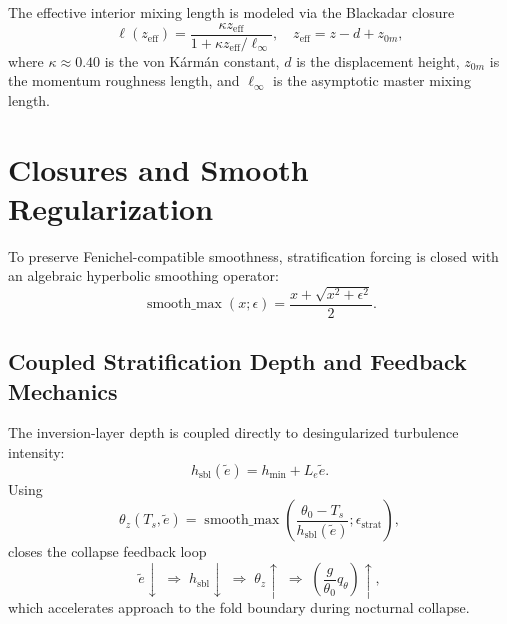 \documentclass[11pt]{article}
\begin{document}
The effective interior mixing length is modeled via the Blackadar closure
\begin{equation}
\ell(z_{\text{eff}}) = \frac{\kappa z_{\text{eff}}}{1 + \kappa z_{\text{eff}}/\ell_\infty}, \quad z_{\text{eff}} = z - d + z_{0m},
\label{eq:blackadar_length}
\end{equation}
where $\kappa \approx 0.40$ is the von Kármán constant, $d$ is the displacement height, $z_{0m}$ is the momentum roughness length, and $\ell_\infty$ is the asymptotic master mixing length.

\section{Closures and Smooth Regularization}
\label{sec:closures}

To preserve Fenichel-compatible smoothness, stratification forcing is closed with an algebraic hyperbolic smoothing operator:
\begin{equation}
\operatorname{smooth\_max}(x;\epsilon)=\frac{x+\sqrt{x^2+\epsilon^2}}{2}.
\label{eq:smooth_max_closure}
\end{equation}

\subsection{Coupled Stratification Depth and Feedback Mechanics}
\label{subsec:coupled_sbl_depth}

The inversion-layer depth is coupled directly to desingularized turbulence intensity:
\begin{equation}
h_{\text{sbl}}(\tilde{e}) = h_{\min} + L_e\tilde{e}.
\label{eq:dynamic_h_sbl}
\end{equation}
Using
\begin{equation}
\theta_z(T_s,\tilde{e}) = \operatorname{smooth\_max}\!\left(\frac{\theta_0-T_s}{h_{\text{sbl}}(\tilde{e})};\epsilon_{\text{strat}}\right),
\label{eq:theta_z_dynamic_hsbl}
\end{equation}
closes the collapse feedback loop
\begin{equation}
\tilde{e}\downarrow\;\Rightarrow\;h_{\text{sbl}}\downarrow\;\Rightarrow\;\theta_z\uparrow\;\Rightarrow\;\left(\frac{g}{\theta_0}q_\theta\right)\uparrow,
\end{equation}
which accelerates approach to the fold boundary during nocturnal collapse.
\end{document}
